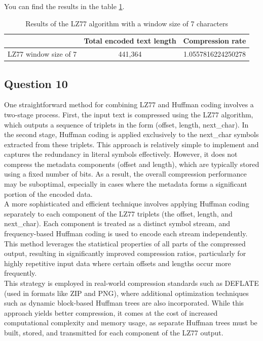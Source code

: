 \documentclass[]{template}
\begin{document}
    You can find the results in the table \ref{tab:lz77_window_size_7}.

    \begin{table}[ht]
        \centering
        \begin{tabular}{|c|c|c|}
        \hline
                                     & Total encoded text length & Compression rate   \\ \hline
        LZ77 window size of 7        & 441,364                   & 1.0557816224250278 \\ \hline
        \end{tabular}
        \caption{Results of the LZ77 algorithm with a window size of 7 characters}\label{tab:lz77_window_size_7}
    \end{table}

    \subsection{Question 10}

    One straightforward method for combining LZ77 and Huffman coding involves a two-stage process. 
    First, the input text is compressed using the LZ77 algorithm, which outputs a sequence of triplets 
    in the form (offset, length, next\_char). In the second stage, Huffman coding is applied exclusively 
    to the next\_char symbols extracted from these triplets. 
    This approach is relatively simple to implement and captures the redundancy in literal symbols effectively. 
    However, it does not compress the metadata components (offset and length), which are typically stored 
    using a fixed number of bits. As a result, the overall compression performance may be suboptimal, 
    especially in cases where the metadata forms a significant portion of the encoded data.\\

    \noindent
    A more sophisticated and efficient technique involves applying Huffman coding separately to each component of the LZ77 triplets (the offset, length, and next\_char). 
    Each component is treated as a distinct symbol stream, and frequency-based Huffman coding is used to encode each stream independently. 
    This method leverages the statistical properties of all parts of the compressed output, resulting in significantly improved compression ratios, 
    particularly for highly repetitive input data where certain offsets and lengths occur more frequently.\\

    \noindent
    This strategy is employed in real-world compression standards such as DEFLATE (used in formats like ZIP and PNG), 
    where additional optimization techniques such as dynamic block-based Huffman trees are also incorporated. 
    While this approach yields better compression, it comes at the cost of increased computational complexity and memory usage, 
    as separate Huffman trees must be built, stored, and transmitted for each component of the LZ77 output.
\end{document}
